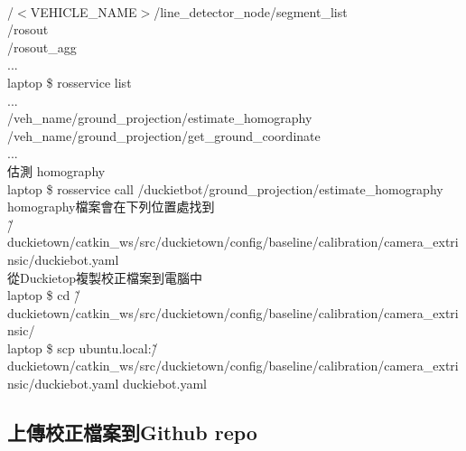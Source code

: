 \documentclass{article}
\begin{document}
\\/$<$VEHICLE\_NAME$>$/line\_detector\_node/segment\_list
\\/rosout
\\/rosout\_agg
\\...
\\laptop \$ rosservice list
\\...
\\/veh\_name/ground\_projection/estimate\_homography
\\/veh\_name/ground\_projection/get\_ground\_coordinate
\\...
\\估測 homography
\\laptop \$ rosservice call /duckietbot/ground\_projection/estimate\_homography
\\homography檔案會在下列位置處找到
\\\~/duckietown/catkin\_ws/src/duckietown/config/baseline/calibration/camera\_extrinsic/duckiebot.yaml
\\從Duckietop複製校正檔案到電腦中
\\laptop \$ cd \~/duckietown/catkin\_ws/src/duckietown/config/baseline/calibration/camera\_extrinsic/
\\laptop \$ scp ubuntu\@duckiebot.local:\~/duckietown/catkin\_ws/src/duckietown/config/baseline/calibration/camera\_extrinsic/duckiebot.yaml duckiebot.yaml

\subsection{上傳校正檔案到Github repo}
\end{document}

